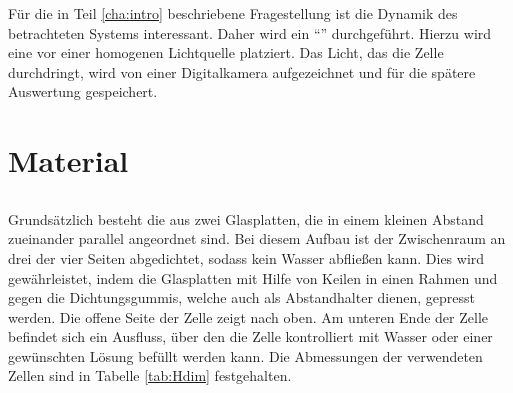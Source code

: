 \label{cha:set}


Für die in Teil \ref{cha:intro} beschriebene Fragestellung ist die Dynamik des betrachteten Systems interessant. Daher wird ein ``\LTM'' durchgeführt. Hierzu wird eine \HSC vor einer homogenen Lichtquelle platziert. Das Licht, das die Zelle durchdringt, wird von einer Digitalkamera aufgezeichnet
und für die spätere Auswertung gespeichert.

\section{Material}
\label{sec:marteria}

\subsection{\HSC}
\label{sec:hsc}
Grundsätzlich besteht die \HSC aus zwei Glasplatten, die in einem kleinen Abstand zueinander parallel angeordnet sind. Bei diesem Aufbau ist der Zwischenraum an drei der vier Seiten abgedichtet, sodass kein Wasser abfließen kann. Dies wird gewährleistet, indem die Glasplatten mit Hilfe von Keilen in einen Rahmen und gegen die Dichtungsgummis, welche auch als Abstandhalter dienen, gepresst werden. Die offene Seite der Zelle zeigt nach oben. Am unteren Ende der Zelle befindet sich ein Ausfluss, über den die Zelle kontrolliert mit Wasser oder einer gewünschten Lösung befüllt werden kann.
Die Abmessungen der verwendeten Zellen sind in Tabelle \ref{tab:Hdim} festgehalten.


